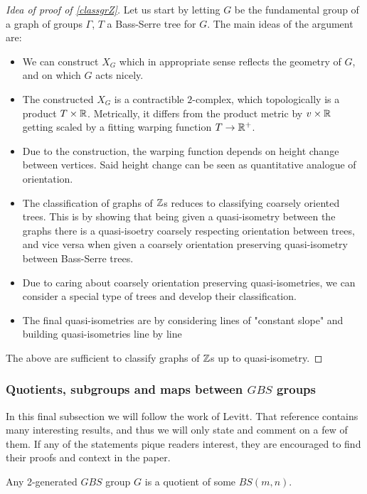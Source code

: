 \begin{proof}[Idea of proof of \ref{classgrZ}]
    Let us start by letting $G$ be the fundamental group of a graph of groups $\Gamma$, $T$ a Bass-Serre tree for $G$. The main ideas of the argument are:
    \begin{itemize}
        \item We can construct $X_G$ which in appropriate sense reflects the geometry of $G$, and on which $G$ acts nicely.
        \item The constructed $X_G$ is a contractible $2$-complex, which topologically is a product $T \times \mathbb{R}$. Metrically, it differs from the product metric by $v \times \mathbb{R}$ getting scaled by a fitting warping function $T \to \mathbb{R}^+$.
        \item Due to the construction, the warping function depends on height change between vertices. Said height change can be seen as quantitative analogue of orientation.
        \item The classification of graphs of $\mathbb{Z}$s reduces to classifying coarsely oriented trees. This is by showing that being given a quasi-isometry between the graphs there is a quasi-isoetry coarsely respecting orientation between trees, and vice versa when given a coarsely orientation preserving quasi-isometry between Bass-Serre trees.
        \item Due to caring about coarsely orientation preserving quasi-isometries, we can consider a special type of trees and develop their classification.
        \item The final quasi-isometries are by considering lines of "constant slope" and building quasi-isometries line by line
    \end{itemize}
The above are sufficient to classify graphs of $\mathbb{Z}$s up to quasi-isometry.
\end{proof}


\subsubsection{Quotients, subgroups and maps between $GBS$ groups} In this final subsection we will follow the work \cite{Le15} of Levitt. That reference contains many interesting results, and thus we will only state and comment on a few of them. If any of the statements pique readers interest, they are encouraged to find their proofs and context in the paper.

\begin{lemma}\cite[Lemma 2.1]{Le15}
    Any 2-generated $GBS$ group $G$ is a quotient of some $BS(m,n)$.
\end{lemma}

